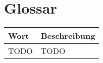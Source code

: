 \chapter{Glossar}
  \begin{longtable}{|p{4cm}|p{10cm}|}
\hline
  Wort & Beschreibung\\
  \hline
  TODO & TODO\\
  \hline
  
  
  \end{longtable}



